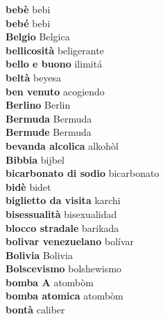 \textbf{ bebè  } bebi \\
\textbf{ bebé  } bebi \\
\textbf{ Belgio  } Belgica \\
\textbf{ bellicosità  } beligerante \\
\textbf{ bello e buono  } ilimitá \\
\textbf{ beltà  } beyesa \\
\textbf{ ben venuto  } acogiendo \\
\textbf{ Berlino  } Berlin \\
\textbf{ Bermuda  } Bermuda \\
\textbf{ Bermude  } Bermuda \\
\textbf{ bevanda alcolica  } alkohòl \\
\textbf{ Bibbia  } bijbel \\
\textbf{ bicarbonato di sodio  } bicarbonato \\
\textbf{ bidè  } bidet \\
\textbf{ biglietto da visita  } karchi \\
\textbf{ bisessualità  } bisexualidad \\
\textbf{ blocco stradale  } barikada \\
\textbf{ bolivar venezuelano  } bolívar \\
\textbf{ Bolivia  } Bolivia \\
\textbf{ Bolscevismo  } bolshewismo \\
\textbf{ bomba A  } atombòm \\
\textbf{ bomba atomica  } atombòm \\
\textbf{ bontà  } caliber \\
